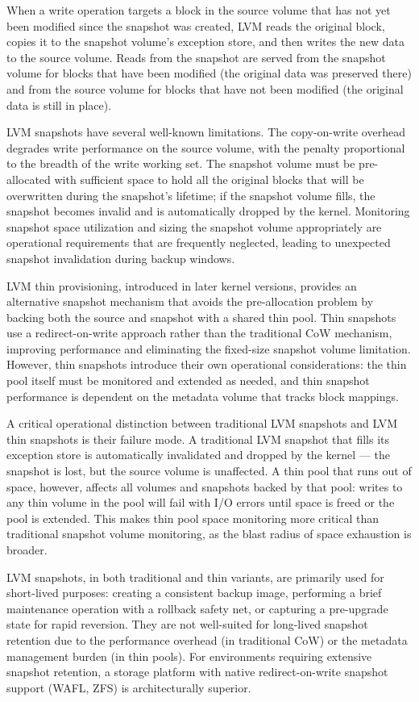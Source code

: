 When a write operation targets a block in the source volume that has not yet been modified since the snapshot was created, LVM reads the original block, copies it to the snapshot volume's exception store, and then writes the new data to the source volume. Reads from the snapshot are served from the snapshot volume for blocks that have been modified (the original data was preserved there) and from the source volume for blocks that have not been modified (the original data is still in place).

LVM snapshots have several well-known limitations. The copy-on-write overhead degrades write performance on the source volume, with the penalty proportional to the breadth of the write working set. The snapshot volume must be pre-allocated with sufficient space to hold all the original blocks that will be overwritten during the snapshot's lifetime; if the snapshot volume fills, the snapshot becomes invalid and is automatically dropped by the kernel. Monitoring snapshot space utilization and sizing the snapshot volume appropriately are operational requirements that are frequently neglected, leading to unexpected snapshot invalidation during backup windows.

LVM thin provisioning, introduced in later kernel versions, provides an alternative snapshot mechanism that avoids the pre-allocation problem by backing both the source and snapshot with a shared thin pool. Thin snapshots use a redirect-on-write approach rather than the traditional CoW mechanism, improving performance and eliminating the fixed-size snapshot volume limitation. However, thin snapshots introduce their own operational considerations: the thin pool itself must be monitored and extended as needed, and thin snapshot performance is dependent on the metadata volume that tracks block mappings.

A critical operational distinction between traditional LVM snapshots and LVM thin snapshots is their failure mode. A traditional LVM snapshot that fills its exception store is automatically invalidated and dropped by the kernel --- the snapshot is lost, but the source volume is unaffected. A thin pool that runs out of space, however, affects all volumes and snapshots backed by that pool: writes to any thin volume in the pool will fail with I/O errors until space is freed or the pool is extended. This makes thin pool space monitoring more critical than traditional snapshot volume monitoring, as the blast radius of space exhaustion is broader.

LVM snapshots, in both traditional and thin variants, are primarily used for short-lived purposes: creating a consistent backup image, performing a brief maintenance operation with a rollback safety net, or capturing a pre-upgrade state for rapid reversion. They are not well-suited for long-lived snapshot retention due to the performance overhead (in traditional CoW) or the metadata management burden (in thin pools). For environments requiring extensive snapshot retention, a storage platform with native redirect-on-write snapshot support (WAFL, ZFS) is architecturally superior.

